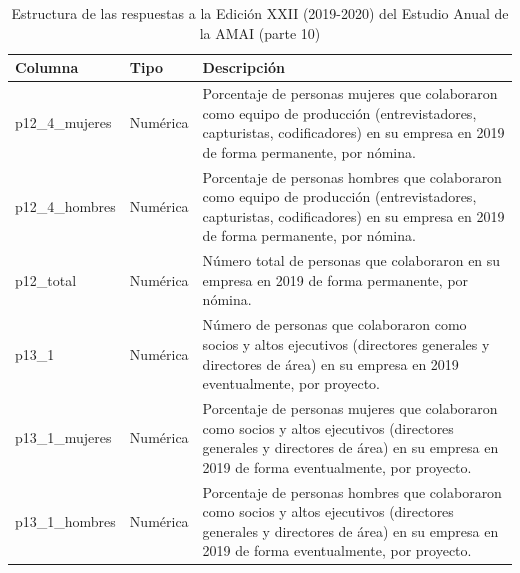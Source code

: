 \begin{table}[]
\caption{Estructura de las respuestas a la Edición XXII (2019-2020) del Estudio Anual de la AMAI (parte 10)}
\label{tab:raw2019_10}
\begin{tabular}{|l|l|l|}
\hline
Columna &
  Tipo &
  Descripción \\ \hline

p12\_4\_mujeres &
  Numérica &
  \parbox[t]{8cm}{Porcentaje de personas mujeres que colaboraron como equipo de producción (entrevistadores, capturistas, codificadores)   en su empresa en 2019 de forma permanente, por nómina.\vspace{0.1cm}} \\ \hline
p12\_4\_hombres &
  Numérica &
  \parbox[t]{8cm}{Porcentaje de personas hombres que colaboraron como equipo de producción (entrevistadores, capturistas, codificadores) en su empresa en 2019 de forma permanente, por nómina.\vspace{0.1cm}} \\ \hline
p12\_total &
  Numérica &
  \parbox[t]{8cm}{Número total de personas que colaboraron en su empresa en 2019 de forma permanente, por nómina.\vspace{0.1cm}} \\ \hline
p13\_1 &
  Numérica &
  \parbox[t]{8cm}{Número de personas que colaboraron como socios y altos ejecutivos (directores generales y directores de área) en su empresa en 2019 eventualmente, por proyecto.\vspace{0.1cm}} \\ \hline
p13\_1\_mujeres &
  Numérica &
  \parbox[t]{8cm}{Porcentaje de personas mujeres que colaboraron como socios y altos ejecutivos (directores generales y directores de área) en su empresa en 2019 de forma eventualmente, por proyecto.\vspace{0.1cm}} \\ \hline
p13\_1\_hombres &
  Numérica &
  \parbox[t]{8cm}{Porcentaje de personas hombres que colaboraron como socios y altos ejecutivos (directores generales y directores de área)  en su empresa en 2019 de forma eventualmente, por proyecto.\vspace{0.1cm}} \\ \hline
\end{tabular}
\end{table}



